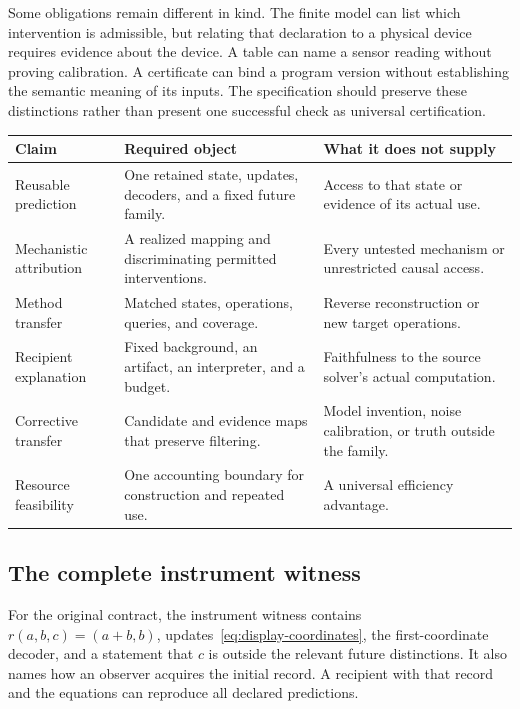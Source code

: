 \documentclass[11pt,letterpaper]{article}
\theoremstyle{plain}
\theoremstyle{definition}
\begin{document}
Some obligations remain different in kind. The finite model can list which intervention is admissible, but relating that declaration to a physical device requires evidence about the device. A table can name a sensor reading without proving calibration. A certificate can bind a program version without establishing the semantic meaning of its inputs. The specification should preserve these distinctions rather than present one successful check as universal certification.

\begin{center}\small
\begin{tabularx}{\textwidth}{@{}P{1.35in}XX@{}}\toprule
Claim & Required object & What it does not supply\\\midrule
Reusable prediction & One retained state, updates, decoders, and a fixed future family. & Access to that state or evidence of its actual use.\\
Mechanistic attribution & A realized mapping and discriminating permitted interventions. & Every untested mechanism or unrestricted causal access.\\
Method transfer & Matched states, operations, queries, and coverage. & Reverse reconstruction or new target operations.\\
Recipient explanation & Fixed background, an artifact, an interpreter, and a budget. & Faithfulness to the source solver's actual computation.\\
Corrective transfer & Candidate and evidence maps that preserve filtering. & Model invention, noise calibration, or truth outside the family.\\
Resource feasibility & One accounting boundary for construction and repeated use. & A universal efficiency advantage.\\\bottomrule
\end{tabularx}\end{center}

\subsection{The complete instrument witness}
For the original contract, the instrument witness contains $r(a,b,c)=(a+b,b)$, updates~\eqref{eq:display-coordinates}, the first-coordinate decoder, and a statement that $c$ is outside the relevant future distinctions. It also names how an observer acquires the initial record. A recipient with that record and the equations can reproduce all declared predictions.
\end{document}
